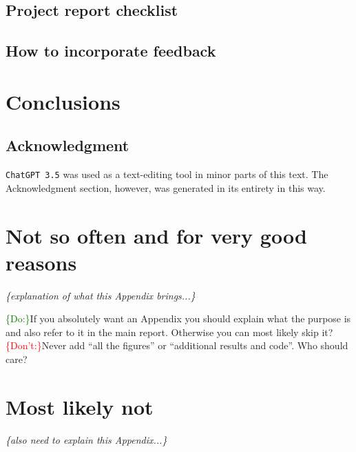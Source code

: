 \documentclass[a4paper,11pt,oneside]{article}
\numberwithin{equation}{section}
\numberwithin{table}{section}
\numberwithin{figure}{section}
\newcommand{\DO}[1]{\textcolor{Green}{\{Do:\}}#1}
\newcommand{\DONT}[1]{\textcolor{Red}{\{Don't:\}}#1}
\newcommand{\blabla}[1]{\textit{\{#1...\}}}
\begin{document}


\subsection{Project report checklist}



\subsection{How to incorporate feedback}






\section{Conclusions}
\label{sec:conclusions}



\subsection*{Acknowledgment}



\medskip

\noindent
\texttt{ChatGPT 3.5} was used as a text-editing tool in minor parts of
this text. The Acknowledgment section, however, was generated in its
entirety in this way.






\clearpage

\appendix

\section{Not so often and for very good reasons}

\blabla{explanation of what this Appendix brings}

\DO{If you absolutely want an Appendix you should explain what the
  purpose is and also refer to it in the main report. Otherwise you
  can most likely skip it?} \DONT{Never add ``all the figures'' or
  ``additional results and code''. Who should care?}

\section{Most likely not}

\blabla{also need to explain this Appendix}
\end{document}
